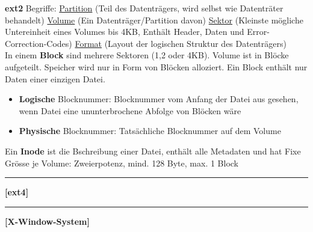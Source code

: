 \documentclass[8pt]{extarticle}
\let\oldtextbf\textbf
\renewcommand{\textbf}{\tiny\oldtextbf}
\begin{document}
\begin{multicols*}{5}
	\textbf{ext2} Begriffe: \underline{Partition} (Teil des Datenträgers, wird selbst wie Datenträter behandelt) \underline{Volume} (Ein Datenträger/Partition davon) \underline{Sektor} (Kleinste mögliche Untereinheit eines Volumes bis 4KB, Enthält Header, Daten und Error-Correction-Codes) \underline{Format} (Layout der logischen Struktur des Datenträgers)\\
	
	In einem \textbf{Block} sind mehrere Sektoren (1,2 oder 4KB). Volume ist in Blöcke aufgeteilt. Speicher wird nur in Form von Blöcken alloziert. Ein Block enthält nur Daten einer einzigen Datei.
	\begin{itemize} [noitemsep, topsep=0pt, leftmargin=*]
		\item \textbf{Logische} Blocknummer: Blocknummer vom Anfang der Datei aus gesehen, wenn Datei eine ununterbrochene Abfolge von Blöcken wäre
		\item \textbf{Physische} Blocknummer: Tatsächliche Blocknummer auf dem Volume
	\end{itemize}
	\vspace{5pt}
	Ein \textbf{Inode} ist die Bschreibung einer Datei, enthält alle Metadaten und hat Fixe Grösse je Volume: Zweierpotenz, mind. 128 Byte, max. 1 Block
	
	\vspace{5pt}
	\rule{\linewidth}{0.4pt}
	\textbf{[ext4]}\\
	
	\vspace{5pt}
	\rule{\linewidth}{0.4pt}
	\textbf{[X-Window-System]}\\
\end{multicols*}
\end{document}
